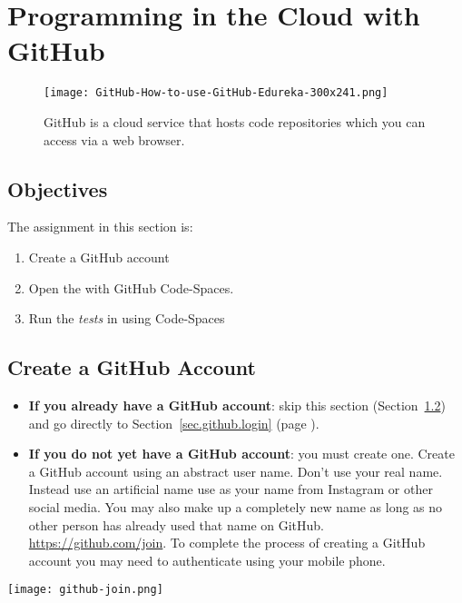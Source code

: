 \section{Programming in the Cloud with GitHub}
\label{sec.github}


\begin{figure}[h]
  \centering
  \texttt{[image: GitHub-How-to-use-GitHub-Edureka-300x241.png]}
  \caption{GitHub is a cloud service that hosts code repositories which 
    you can access via a web browser.}
\end{figure}

\subsection{Objectives}
The assignment in this section is:
\begin{enumerate}
\item Create a GitHub account
\item Open the  with GitHub Code-Spaces.
\item Run the \emph{tests}  in using Code-Spaces
\end{enumerate}



\clearpage
\subsection{Create a GitHub Account}
\label{sec.account.create}
\begin{itemize}
\item \textbf{If you already have a GitHub account}: skip this section
(Section~\ref{sec.account.create}) and go directly to
Section~\ref{sec.github.login} (page \pageref{sec.github.login}).


\item \textbf{If you do not yet have a GitHub account}: you must create one.
Create a GitHub account using an abstract user name.  Don't use your
real name.  Instead use an artificial name use as your name from
Instagram or other social media.  You may also make up a completely
new name as long as no other person has already used that name on
GitHub.  \url{https://github.com/join}.  To complete the process of
creating a GitHub account you may need to authenticate using your
mobile phone.
\end{itemize}


\noindent\texttt{[image: github-join.png]}


